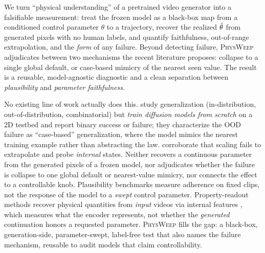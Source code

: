 \documentclass[10pt,twocolumn,letterpaper]{article}
\begin{document}
We turn ``physical understanding'' of
a pretrained video generator into a falsifiable measurement: treat the frozen
model as a black-box map from a conditioned control parameter $\theta$ to a
trajectory, recover the realized $\hat{\theta}$ from generated pixels with no human
labels, and quantify faithfulness, out-of-range extrapolation, and the
\emph{form} of any failure. Beyond detecting failure, \textsc{PhysWeep}
adjudicates between two mechanisms the recent literature proposes: collapse to
a single global default, or case-based mimicry of the nearest seen value. The
result is a reusable, model-agnostic diagnostic and a clean separation between
\emph{plausibility} and \emph{parameter faithfulness}.

No existing line of work actually does this. \citet{kang2025howfar} study generalization (in-distribution, out-of-distribution,
combinatorial) but \emph{train diffusion models from scratch} on a 2D testbed
and report binary success or failure; they characterize the OOD failure as
``case-based'' generalization, where the model mimics the nearest training
example rather than abstracting the law. \citet{invisiblehand2026} corroborate
that scaling fails to extrapolate and probe \emph{internal} states. Neither
recovers a continuous parameter from the generated pixels of a frozen model,
nor adjudicates whether the failure is collapse to one global default or
nearest-value mimicry, nor connects the effect to a controllable knob.
Plausibility benchmarks \citep{motamed2025physicsiq,zhang2025morpheus,bansal2025videophy2,vbench2_2025}
measure adherence on fixed clips, not the response of the model to a
\emph{swept} control parameter. Property-readout methods recover physical
quantities from \emph{input} videos via internal features
\citep{inferring2025dynamic,invisiblehand2026}, which measures what the
encoder represents, not whether the \emph{generated} continuation honors a
requested parameter. \textsc{PhysWeep} fills the gap: a black-box,
generation-side, parameter-swept, label-free test that also names the failure
mechanism, reusable to audit models that claim controllability.
\end{document}
